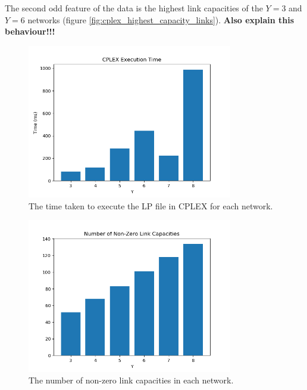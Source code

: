 \documentclass[12pt]{article} %
\begin{document}
\noindent The second odd feature of the data is the highest link capacities of the $Y=3$ and $Y=6$ networks (figure \ref{fig:cplex_highest_capacity_links}). \textbf{Also explain this behaviour!!!}

\begin{figure}[H]
	\centering
	\includegraphics[width=0.8\textwidth]{cplex_data_time}
	\caption{The time taken to execute the LP file in CPLEX for each network.}
	\label{fig:cplex_time}
\end{figure}

\begin{figure}[H]
	\centering
	\includegraphics[width=0.8\textwidth]{cplex_data_num_nonzero_links}
	\caption{The number of non-zero link capacities in each network.}
	\label{fig:cplex_num_nonzero_links}
\end{figure}
\end{document}
